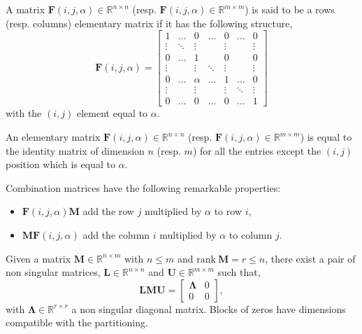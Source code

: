 		\begin{definition}
			A matrix $\bm{F}(i,j,\alpha)\in\mathbb{R}^{n\times n}$ (resp. $\bm{F}(i,j,\alpha)\in\mathbb{R}^{m\times m}$) is said to be a rows (resp. columns) elementary matrix if it has the following structure,
			\begin{equation}
				\bm{F}(i,j,\alpha) =
				\begin{bmatrix}
					1  		& 	\dots 	& 0 		& \dots 	& 0 		& \dots 	& 0 \\
					\vdots 	&	\ddots	& \vdots 	& 			& \vdots	& 			& \vdots \\
					0		& 	\dots	& 1			& 			& 0			& 			& 0 \\
					\vdots	& 			& \vdots 	& \ddots 	& \vdots 	& 			& \vdots \\ 	
					0		& \dots		& \alpha 	& \dots		& 1			& \dots		& 0 \\
					\vdots	& 			& \vdots	& 			& \vdots	& \ddots	& \vdots \\
					0 		& \dots		& 0			& \dots		& 0			& \dots 	& 1
				\end{bmatrix}
			\end{equation}
			with the $(i,j)$ element equal to $\alpha$.	
		\end{definition}
		\begin{remark}
			An elementary matrix $\bm{F}(i,j,\alpha)\in\mathbb{R}^{n\times n}$ (resp. $\bm{F}(i,j,\alpha)\in\mathbb{R}^{m\times m}$) is equal to the identity matrix of dimension $n$ (resp. $m$) for all the entries except the $(i,j)$ position which is equal to $\alpha$. 
		\end{remark}
		Combination matrices have the following remarkable properties:
		\begin{itemize}
			\item $\bm{F}(i,j,\alpha)\bm{M}$ add the row $j$ multiplied by $\alpha$ to row $i$,
			\item $\bm{MF}(i,j,\alpha)$ add the column $i$ multiplied by $\alpha$ to column $j$.
		\end{itemize}
		\begin{theorem}
			\label{th:gausssimply}
			Given a matrix $\bm{M}\in\mathbb{R}^{n\times m}$ with $n\leq m$ and $\textrm{rank}~\bm{M} = r\leq n$, there exist a pair of non singular matrices, $\bm{L}\in\mathbb{R}^{n\times n}$ and $\bm{U}\in\mathbb{R}^{m\times m}$ such that,
			\begin{equation}
				\bm{LMU} = 
				\begin{bmatrix}
					\bm{\Lambda} & 0 \\
					0 		& 0
				\end{bmatrix},
			\end{equation}
			with $\bm{\Lambda}\in\mathbb{R}^{r\times r}$ a non singular diagonal  matrix. Blocks of zeros have dimensions compatible with the partitioning.
		\end{theorem}
